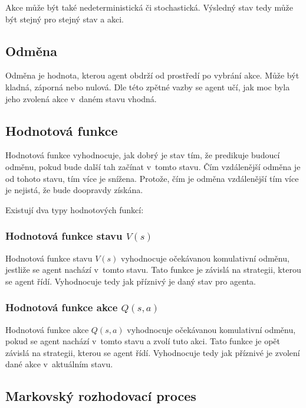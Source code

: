 Akce může být také nedeterministická či stochastická.
Výsledný stav tedy může být stejný pro stejný stav a akci.
  
\subsection{Odměna}\label{subsec:odmena}

  Odměna je hodnota, kterou agent obdrží od prostředí po vybrání akce.
  Může být kladná, záporná nebo nulová.
  Dle této zpětné vazby se agent učí, jak moc byla jeho zvolená akce v~daném stavu vhodná.

\subsection{Hodnotová funkce}\label{subsec:hodnotova-funkce}

  Hodnotová funkce vyhodnocuje, jak dobrý je stav tím, že predikuje budoucí odměnu, pokud bude další tah začínat v~tomto stavu.
  Čím vzdálenější odměna je od tohoto stavu, tím více je snížena.
  Protože, čím je odměna vzdálenější tím více je nejistá, že bude doopravdy získána.

  Existují dva typy hodnotových funkcí:

  \subsubsection*{Hodnotová funkce stavu $V(s)$}

  Hodnotová funkce stavu \emph{$V(s)$} vyhodnocuje očekávanou komulativní odměnu, jestliže se agent nachází v~tomto stavu.
  Tato funkce je závislá na strategii, kterou se agent řídí.
  Vyhodnocuje tedy jak příznivý je daný stav pro agenta.

  \subsubsection*{Hodnotová funkce akce $Q(s, a)$}
  \label{subsubsec:q_function}

  Hodnotová funkce akce \emph{$Q(s, a)$} vyhodnocuje očekávanou komulativní odměnu, pokud se agent nachází v~tomto stavu a zvolí tuto akci.
  Tato funkce je opět závislá na strategii, kterou se agent řídí.
  Vyhodnocuje tedy jak příznivé je zvolení dané akce v~aktuálním stavu.

\subsection{Markovský rozhodovací proces}\label{subsec:markovsky-rozhodovaci-proces}

